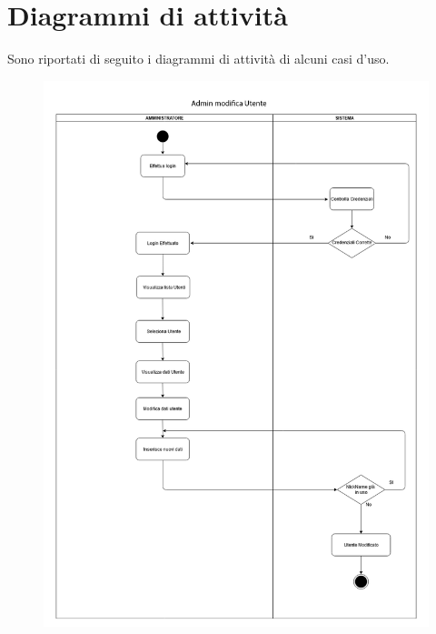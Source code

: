 \section{Diagrammi di attività}
Sono riportati di seguito i diagrammi di attività di alcuni casi d'uso.
\begin{figure}[h!]
    \includegraphics[width=\textwidth]{SequenceAnalisi/9.png}
\end{figure}
